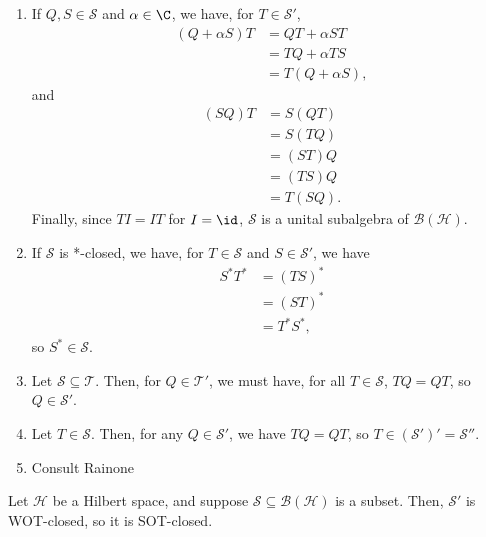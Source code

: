\documentclass[10pt]{mypackage}
\begin{document}
\begin{solution}[]\hfill
  \begin{enumerate}[(1)]
    \item If $Q,S\in \mathcal{S}$ and $\alpha \in \C$, we have, for $T\in \mathcal{S}'$,
      \begin{align*}
        \left(Q + \alpha S\right)T &= QT + \alpha ST\\
                                   &= TQ + \alpha TS\\
                                   &= T\left(Q + \alpha S\right),
      \end{align*}
      and
      \begin{align*}
        \left(SQ\right)T &= S\left(QT\right)\\
                         &= S\left(TQ\right)\\
                         &= \left(ST\right)Q\\
                         &= \left(TS\right)Q\\
                         &= T\left(SQ\right).
      \end{align*}
      Finally, since $TI = IT$ for $I = \id$, $\mathcal{S}$ is a unital subalgebra of $\mathcal{B}\left(\mathcal{H}\right)$.
    \item If $\mathcal{S}$ is *-closed, we have, for $T\in \mathcal{S}$ and $S\in \mathcal{S}'$, we have
      \begin{align*}
        S^{\ast}T^{\ast} &= \left(TS\right)^{\ast}\\
                         &= \left(ST\right)^{\ast}\\
                         &= T^{\ast}S^{\ast},
      \end{align*}
      so $S^{\ast}\in \mathcal{S}$.
    \item Let $\mathcal{S}\subseteq \mathcal{T}$. Then, for $Q\in \mathcal{T}'$, we must have, for all $T\in \mathcal{S}$, $TQ = QT$, so $Q\in \mathcal{S}'$.
    \item Let $T\in \mathcal{S}$. Then, for any $Q\in \mathcal{S}'$, we have $TQ = QT$, so $T\in \left(\mathcal{S}'\right)'= \mathcal{S}''$.
    \item Consult Rainone
  \end{enumerate}
\end{solution}
\begin{lemma}
  Let $\mathcal{H}$ be a Hilbert space, and suppose $\mathcal{S}\subseteq \mathcal{B}\left(\mathcal{H}\right)$ is a subset. Then, $\mathcal{S}'$ is WOT-closed, so it is SOT-closed.
\end{lemma}
\end{document}
